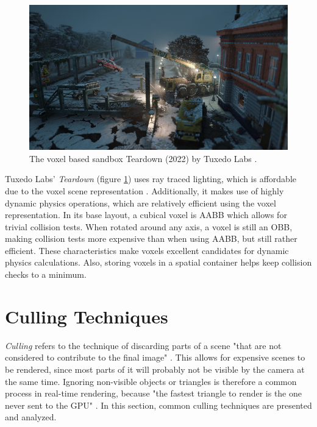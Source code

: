 \begin{figure}[h]
    \centering
    \includegraphics[width=\linewidth]{images/graphics/teardown.jpg}
    \caption{The voxel based sandbox Teardown (2022) by Tuxedo Labs \cite{TuxedoLabs2022}.}
    \label{fig:teardown}
\end{figure}

\noindent
Tuxedo Labs' \emph{Teardown} (figure \ref{fig:teardown}) uses ray traced lighting, which is affordable due 
to the voxel scene representation \cite{TuxedoLabs2022}. Additionally, it makes use of highly dynamic physics 
operations, which are relatively efficient using the voxel representation. In its base layout, a cubical 
voxel is \ac{AABB} which allows for trivial collision tests. When rotated around any axis, a voxel is 
still an \ac{OBB}, making collision tests more expensive than when using \ac{AABB}, but still rather efficient. 
These characteristics make voxels excellent candidates for dynamic physics calculations. Also, storing voxels in 
a spatial container helps keep collision checks to a minimum.


\section{Culling Techniques} \label{sec-culling-techniques}

\emph{Culling} refers to the technique of discarding parts of a scene "that are not considered to contribute to 
the final image" \cite{AkenineMoeller2018}. This allows for expensive scenes to be rendered, since most parts of it 
will probably not be visible by the camera at the same time. Ignoring non-visible objects or triangles is therefore a 
common process in real-time rendering, because "the fastest triangle to render is the one never sent to the \ac{GPU}" 
\cite{AkenineMoeller2018}. In this section, common culling techniques are presented and analyzed. 


